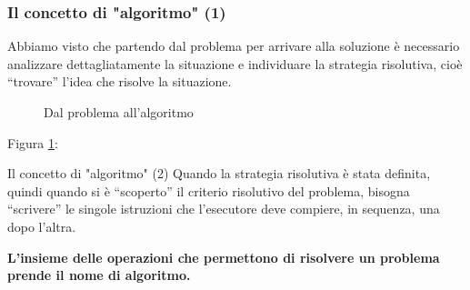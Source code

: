 \documentclass[
    notheorems,
    11pt,
    compress,
    aspectratio=169
]{beamer}
\begin{document}
\begin{frame}[fragile]
    \frametitle{Il concetto di "algoritmo" (1)}
    
    Abbiamo visto che partendo dal problema per arrivare alla soluzione è necessario analizzare dettagliatamente la situazione e individuare la strategia risolutiva, cioè “trovare” l’idea che risolve la situazione.

    \pause
    \vfill

    \begin{figure}
        \centering
    
        \caption{Dal problema all'algoritmo}
        \label{fig:fig21}
    \end{figure}

    {Figura \ref{fig:fig21}:} \cite[p. 323]{ISBN_8820378434}
\end{frame}

\begin{frame}{Il concetto di "algoritmo" (2)}
    Quando la strategia risolutiva è stata definita, quindi quando si è “scoperto” il criterio risolutivo del problema, bisogna “scrivere” le singole istruzioni che l’esecutore deve compiere, in sequenza, una dopo l’altra.

    \pause
    \vspace{0.5cm}

    \textbf{L’insieme delle operazioni che permettono di risolvere un problema prende il nome di algoritmo.}
\end{frame}
\end{document}
